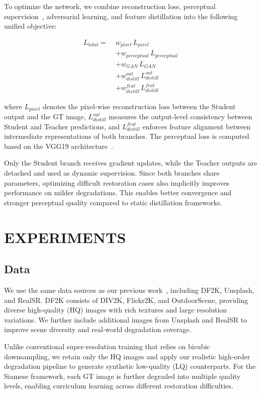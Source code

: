 \documentclass[conference]{IEEEtran}
\begin{document}
To optimize the network, we combine reconstruction loss, perceptual supervision~\cite{johnson2016perceptual}, adversarial learning, and feature distillation into the following unified objective:

\[
\begin{aligned}
L_{total} =\;&
w_{pixel} \, L_{pixel} \\
&+ w_{perceptual} \, L_{perceptual} \\
&+ w_{GAN} \, L_{GAN} \\
&+ w_{distill}^{out} \, L_{distill}^{out} \\
&+ w_{distill}^{feat} \, L_{distill}^{feat}
\end{aligned}
\]

where $L_{pixel}$ denotes the pixel-wise reconstruction loss between the Student output and the GT image, $L_{distill}^{out}$ measures the output-level consistency between Student and Teacher predictions, and $L_{distill}^{feat}$ enforces feature alignment between intermediate representations of both branches. The perceptual loss is computed based on the VGG19 architecture~\cite{simonyan2014very}.

Only the Student branch receives gradient updates, while the Teacher outputs are detached and used as dynamic supervision. Since both branches share parameters, optimizing difficult restoration cases also implicitly improves performance on milder degradations. This enables better convergence and stronger perceptual quality compared to static distillation frameworks.


\section{EXPERIMENTS}
\subsection{Data}
We use the same data sources as our previous work~\cite{11309534}, including DF2K, Unsplash, and RealSR. DF2K consists of DIV2K, Flickr2K, and OutdoorScene, providing diverse high-quality (HQ) images with rich textures and large resolution variations. We further include additional images from Unsplash and RealSR to improve scene diversity and real-world degradation coverage.

Unlike conventional super-resolution training that relies on bicubic downsampling, we retain only the HQ images and apply our realistic high-order degradation pipeline to generate synthetic low-quality (LQ) counterparts. For the Siamese framework, each GT image is further degraded into multiple quality levels, enabling curriculum learning across different restoration difficulties.
\end{document}

